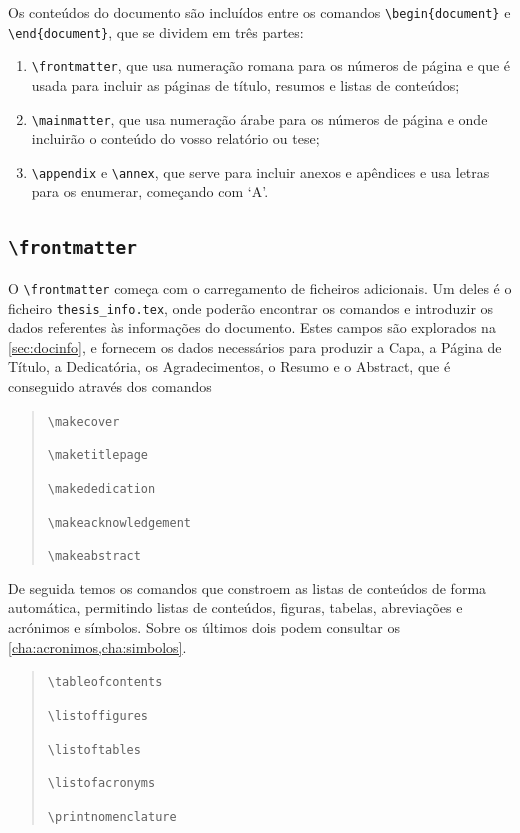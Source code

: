 Os conteúdos do documento são incluídos entre os comandos \texttt{\textbackslash begin\{document\}} e \texttt{\textbackslash end\{document\}}, que se dividem em três partes:
\begin{enumerate}
\item\texttt{\textbackslash frontmatter}, que usa numeração romana para os números de página e que é usada para incluir as páginas de título, resumos e listas de conteúdos;
\item\texttt{\textbackslash mainmatter}, que usa numeração árabe para os números de página e onde incluirão o conteúdo do vosso relatório ou tese;
\item\texttt{\textbackslash appendix} e \texttt{\textbackslash annex}, que serve para incluir anexos e apêndices e usa letras para os enumerar, começando com `A'.
\end{enumerate}

\subsection{\texttt{\textbackslash frontmatter}}

O \texttt{\textbackslash frontmatter} começa com o carregamento de ficheiros adicionais. Um deles é o ficheiro \texttt{thesis\_info.tex}, onde poderão encontrar os comandos e introduzir os dados referentes às informações do documento. Estes campos são explorados na \cref{sec:docinfo}, e fornecem os dados necessários para produzir a Capa, a Página de Título, a Dedicatória, os Agradecimentos, o Resumo e o Abstract, que é conseguido através dos comandos
\begin{quote}
    \texttt{\textbackslash makecover}

    \texttt{\textbackslash maketitlepage}

    \texttt{\textbackslash makededication}

    \texttt{\textbackslash makeacknowledgement}

    \texttt{\textbackslash makeabstract}
\end{quote}

De seguida temos os comandos que constroem as listas de conteúdos de forma automática, permitindo listas de conteúdos, figuras, tabelas, abreviações e acrónimos e símbolos. Sobre os últimos dois podem consultar os \cref{cha:acronimos,cha:simbolos}.

\begin{quote}
    \texttt{\textbackslash tableofcontents}

    \texttt{\textbackslash listoffigures}

    \texttt{\textbackslash listoftables}

    \texttt{\textbackslash listofacronyms}

    \texttt{\textbackslash printnomenclature}
\end{quote}

